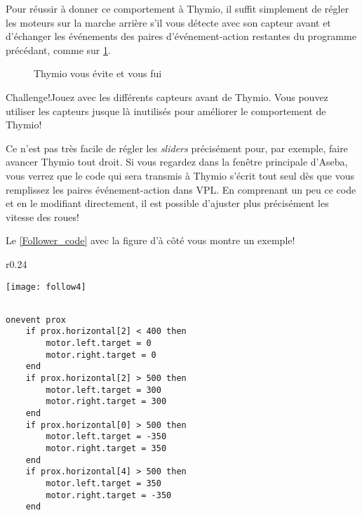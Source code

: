 Pour réussir à donner ce  comportement à Thymio, il suffit simplement de régler les moteurs sur la marche arrière s'il vous détecte avec son capteur avant et d'échanger les événements des paires d'événement-action restantes du programme précédant, comme sur \cref{fig.recule-evite}.

\begin{figure}[h]
    \centering
    \hspace{1cm}
    \caption{Thymio vous évite et vous fui}
    \label{fig.recule-evite}
\end{figure}

\begin{bclogo}[couleur = pink!30, arrondi = 0.1, logo = \bccrayon, ombre = true]{Challenge!}Jouez avec les différents capteurs avant de Thymio. Vous pouvez utiliser les capteurs jusque là inutilisés pour améliorer le comportement de Thymio!
\end{bclogo}


Ce n'est pas très facile de régler les \textit{sliders} précisément pour, par exemple, faire avancer Thymio tout droit. Si vous regardez dans la fenêtre principale d'Aseba, vous verrez que le code qui sera transmis à Thymio s'écrit tout seul dès que vous remplissez les paires événement-action dans VPL. En comprenant un peu ce code et en le modifiant directement, il est possible d'ajuster plus précisément les vitesse des roues!

Le \cref{Follower_code} avec la figure d'à côté vous montre un exemple!

\begin{wrapfigure}{r}{0.24\textwidth}
  \begin{center}
    \texttt{[image: follow4]}
  \end{center}
\end{wrapfigure}

\begin{small}
\begin{lstlisting}[frame=single, caption={Thymio vous suit}, label=Follower_code, linewidth=9cm] 

onevent prox
	if prox.horizontal[2] < 400 then
		motor.left.target = 0
		motor.right.target = 0
	end
	if prox.horizontal[2] > 500 then
		motor.left.target = 300
		motor.right.target = 300
	end
	if prox.horizontal[0] > 500 then
		motor.left.target = -350
		motor.right.target = 350
	end
	if prox.horizontal[4] > 500 then
		motor.left.target = 350
		motor.right.target = -350
	end

\end{lstlisting}
	\end{small}

